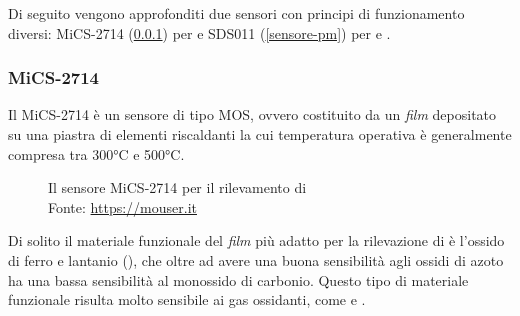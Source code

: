 Di seguito vengono approfonditi due sensori con principi di funzionamento diversi: MiCS-2714 (\ref{sensore-no2}) per  e SDS011 (\ref{sensore-pm}) per  e .

\subsubsection{MiCS-2714}\label{sensore-no2}
Il MiCS-2714 è un sensore di tipo MOS, ovvero costituito da un \textit{film} depositato su una piastra di elementi riscaldanti la cui temperatura operativa è generalmente compresa tra 300°C e 500°C. \cite{relazione_alice}

\begin{figure}[H]%
    \centering
    \captionsetup{justification=centering}
    \caption{Il sensore MiCS-2714 per il rilevamento di \\Fonte: \url{https://mouser.it}}%
    \label{fig:mics}%
\end{figure}

Di solito il  materiale funzionale del \textit{film} più adatto per la rilevazione di  è l’ossido  di  ferro e lantanio (), che oltre ad avere una buona sensibilità agli ossidi di azoto ha una bassa sensibilità al  monossido di carbonio. Questo tipo  di  materiale  funzionale risulta  molto  sensibile  ai  gas  ossidanti, come  e . 

